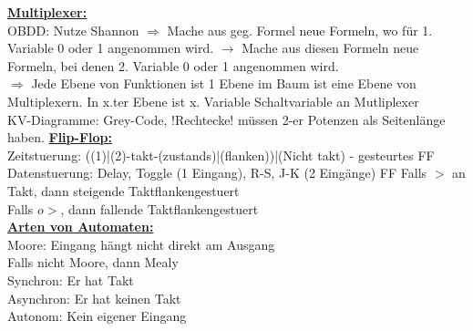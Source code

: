 \documentclass[11pt]{article}
\begin{document}
\begin{minipage}{0.3\textwidth}
\underline{\textbf{Multiplexer:}}\\
OBDD: Nutze Shannon
\phantom{ss} $\Rightarrow$ Mache aus geg. Formel neue Formeln, wo für 1. Variable 0 oder 1 angenommen wird. $\rightarrow$ Mache aus diesen Formeln neue Formeln, bei denen 2. Variable 0 oder 1 angenommen wird.\\
\phantom{ss} $\Rightarrow$ Jede Ebene von Funktionen ist 1 Ebene im Baum ist eine Ebene von Multiplexern. In x.ter Ebene ist x. Variable Schaltvariable an Mutliplexer\\
KV-Diagramme: Grey-Code, !Rechtecke! müssen 2-er Potenzen als Seitenlänge haben.
\underline{\textbf{Flip-Flop:}}\\
Zeitstuerung: ((1)|(2)-takt-(zustands)|(flanken))|(Nicht takt) - gesteurtes FF
Datenstuerung: Delay, Toggle (1 Eingang), R-S, J-K (2 Eingänge) FF
Falls $>$ an Takt, dann steigende Taktflankengestuert\\
Falls $o>$, dann fallende Taktflankengestuert\\
\underline{\textbf{Arten von Automaten:}}\\
Moore: Eingang hängt nicht direkt am Ausgang\\
Falls nicht Moore, dann Mealy\\
Synchron: Er hat Takt\\
Asynchron: Er hat keinen Takt\\
Autonom: Kein eigener Eingang\\

\end{minipage}%

\end{document}
